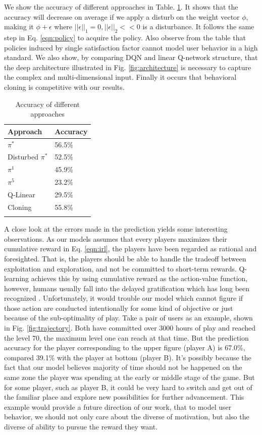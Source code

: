 \documentclass{sigchi}
\begin{document}
We show the accuracy of different approaches in Table. \ref{tbl:accuracy}. 
It shows that the accuracy will decrease on average if we apply a disturb on the weight vector $\phi$, making it $\phi+\epsilon$ where $||\epsilon||_1=0, ||\epsilon||_2<<0$ is a disturbance.
It follows the same step in Eq. \eqref{eqn:policy} to acquire the policy.
Also observe from the table that policies induced by single satisfaction factor cannot model user behavior in a high standard.
We also show, by comparing DQN and linear Q-network structure, that the deep architecture illustrated in Fig. \ref{fig:architecture} is necessary to capture the complex and multi-dimensional input.
Finally it occurs that behavioral cloning is competitive with our results.

\begin{table}
\caption{Accuracy of different approaches}
\begin{tabularx}{\textwidth}{ll}
    Approach & Accuracy \\
    \midrule
    $\pi^\ast$ & 56.5\% \\
    Disturbed $\pi^\ast$ & 52.5\% \\
    $\pi^1$ & 45.9\% \\
    $\pi^5$ & 23.2\% \\
    Q-Linear & 29.5\% \\
    Cloning & 55.8\% \\
    \label{tbl:accuracy}
\end{tabularx}
\end{table}

A close look at the errors made in the prediction yields some interesting observations. 
As our models assumes that every players maximizes their cumulative reward in Eq. \eqref{eqn:irl}, the players have been regarded as rational and foresighted.
That is, the players should be able to handle the tradeoff between exploitation and exploration, and not be committed to short-term rewards.
Q-learning achieves this by using cumulative reward as the action-value function, however, humans usually fall into the delayed gratification which has long been recognized \cite{mischel1972cognitive}.
Unfortunately, it would trouble our model which cannot figure if those action are conducted intentionally for some kind of objective or just because of the sub-optimality of play.
Take a pair of users as an example, shown in Fig. \ref{fig:trajectory}.
Both have committed over 3000 hours of play and reached the level 70, the maximum level one can reach at that time.
But the prediction accuracy for the player corresponding to the upper figure (player A) is 67.0\%, compared 39.1\% with the player at bottom (player B).
It's possibly because the fact that our model believes majority of time should not be happened on the same zone the player was spending at the early or middle stage of the game.
But for some player, such as player B, it could be very hard to switch and get out of the familiar place and explore new possibilities for further advancement.
This example would provide a future direction of our work, that to model user behavior, we should not only care about the diverse of motivation, but also the diverse of ability to pursue the reward they want.
\end{document}
